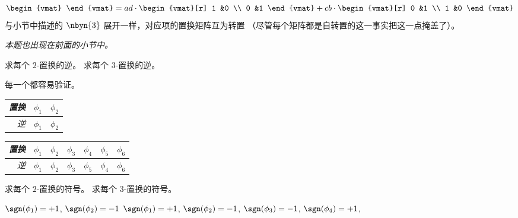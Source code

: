 \begin{exercises}
\begin{answer}
\begin{equation*}
\begin{vmat}
         \end{vmat}
         =ad\cdot\begin{vmat}[r]
                    1  &0  \\
                    0  &1
                 \end{vmat}
         +cb\cdot\begin{vmat}[r]
                   0  &1 \\
                   1  &0
                 \end{vmat}
       \end{equation*}
       与小节中描述的 $\nbyn{3}$ 展开一样，对应项的置换矩阵互为转置
       （尽管每个矩阵都是自转置的这一事实把这一点掩盖了）。
    \end{answer}
  \recommended \item 
    \textit{本题也出现在前面的小节中。}
    \begin{exparts}
      \partsitem 求每个 $2$-置换的逆。
      \partsitem 求每个 $3$-置换的逆。
    \end{exparts}
    \begin{answer}
      每一个都容易验证。
      \begin{exparts}
        \partsitem 
          \begin{tabular}[t]{r|cc}
            \textit{置换} &$\phi_1$  &$\phi_2$ \\
             \hline
            \textit{逆}     &$\phi_1$  &$\phi_2$ 
          \end{tabular}
        \partsitem 
          \begin{tabular}[t]{r|cccccc}
            \textit{置换} 
              &$\phi_1$ &$\phi_2$ &$\phi_3$ &$\phi_4$ &$\phi_5$ &$\phi_6$ \\
            \hline
            \textit{逆}
              &$\phi_1$ &$\phi_2$ &$\phi_3$ &$\phi_5$ &$\phi_4$ &$\phi_6$ 
          \end{tabular}
      \end{exparts}
    \end{answer}
  \recommended \item
    \begin{exparts}
      \partsitem 求每个 $2$-置换的符号。
      \partsitem 求每个 $3$-置换的符号。
    \end{exparts}
    \begin{answer}
      \begin{exparts}
        \partsitem \( \sgn(\phi_1)=+1 \), \( \sgn(\phi_2)=-1 \)
        \partsitem \( \sgn(\phi_1)=+1 \), \( \sgn(\phi_2)=-1 \),
              \( \sgn(\phi_3)=-1 \), \( \sgn(\phi_4)=+1 \),

\end{exparts}
\end{answer}
\end{exercises}
